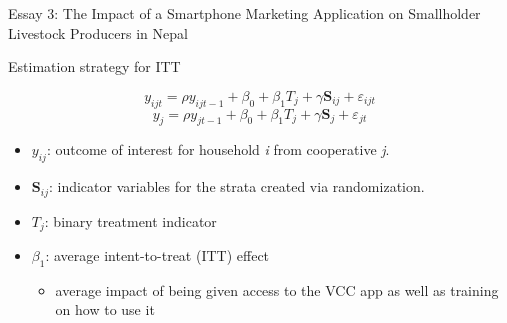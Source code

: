 \documentclass[aspectratio=169]{beamer}
\newenvironment{wideitemize}{\itemize\addtolength{\itemsep}{10pt}}{\enditemize}
\begin{document}
\begin{frame}{Essay 3: The Impact of a Smartphone Marketing Application on Smallholder Livestock Producers in Nepal}

\begin{wideitemize}
    \item Estimation strategy for ITT

\begin{equation} \label{eq:ITT1}
y_{ijt} = \rho y_{ijt-1} + \beta_{0} + \beta_{1} T_{j} + \gamma \textbf{S}_{ij} + \varepsilon_{ijt}
\end{equation}
\begin{equation} \label{eq:ITT2}
y_{j} = \rho y_{jt-1} + \beta_{0} + \beta_{1} T_{j} + \gamma \textbf{S}_{j} + \varepsilon_{jt}
\end{equation}

    \vspace{.25cm}
    \begin{itemize}
        \item $y_{ij}$: outcome of interest for household \textit{i} from cooperative \textit{j}. \item $\textbf{S}_{ij}$: indicator variables for the strata created via randomization. \item $T_{j}$: binary treatment indicator
        \item $\beta_{1}$: average intent-to-treat (ITT) effect
            \begin{itemize}
                \item average impact of being given access to the VCC app as well as training on how to use it
            \end{itemize}
    \end{itemize}
\end{wideitemize}
\end{frame}
\end{document}
